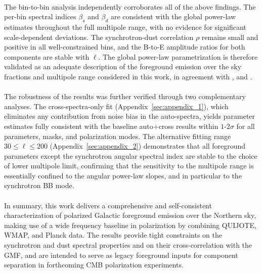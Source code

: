 \paragraph{}

The bin-to-bin analysis independently corroborates all of the above findings. The per-bin spectral indices $\beta_s$ and $\beta_d$ are consistent with the global power-law estimates throughout the full multipole range, with no evidence for significant scale-dependent deviations. The synchrotron-dust correlation $\rho$ remains small and positive in all well-constrained bins, and the B-to-E amplitude ratios for both components are stable with $\ell$. The global power-law parametrization is therefore validated as an adequate description of the foreground emission over the sky fractions and multipole range considered in this work, in agreement with \citet{Martire_2022}, and \citet{Planck_2018XI}.

\paragraph{}

The robustness of the results was further verified through two complementary analyses. The cross-spectra-only fit (Appendix~\ref{sec:appendix_1}), which eliminates any contribution from noise bias in the auto-spectra, yields parameter estimates fully consistent with the baseline auto+cross results within $1$-$2\sigma$ for all parameters, masks, and polarization modes. The alternative fitting range $30 \leq \ell \leq 200$ (Appendix~\ref{sec:appendix_2}) demonstrates that all foreground parameters except the synchrotron angular spectral index are stable to the choice of lower multipole limit, confirming that the sensitivity to the multipole range is essentially confined to the angular power-law slopes, and in particular to the synchrotron BB mode.

\paragraph{}

In summary, this work delivers a comprehensive and self-consistent characterization of polarized Galactic foreground emission over the Northern sky, making use of a wide frequency baseline in polarization by combining QUIJOTE, WMAP, and Planck data. The results provide tight constraints on the synchrotron and dust spectral properties and on their cross-correlation with the GMF, and are intended to serve as legacy foreground inputs for component separation in forthcoming CMB polarization experiments.

